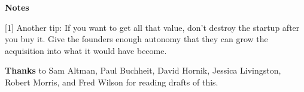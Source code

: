                   \textbf{Notes}

[1] Another tip: If you want to get all that value, don't
                  destroy the startup after you buy it. Give the founders enough
                  autonomy that they can grow the acquisition into what it would
                  have become.

\textbf{Thanks} to Sam Altman, Paul
                  Buchheit, David Hornik, Jessica Livingston, Robert Morris, and
                  Fred Wilson for reading drafts of this.


              
            
          
